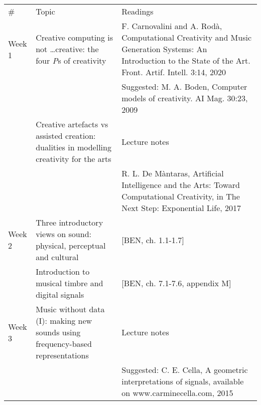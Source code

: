 \documentclass[letterpaper]{inzane_syllabus} %
\begin{document}
\begin{center}
\begin{tabularx}{\textwidth}{p{2cm}p{8cm} @{\hskip 0.5cm} p{9.5cm}} %
\arrayrulecolor{myCOLOR}\hline
\hline 
\hline 

\multicolumn{3}{l}{\textbf{\textcolor{myCOLOR}{\large MODULE 1: Foundations }}} \\
\hline
  \# & Topic & Readings \\ \hline 
Week 1 &
Creative computing is not \ldots creative: the four \emph{P}s of creativity & F. Carnovalini and A. Rod\`a, Computational Creativity and Music Generation Systems: An Introduction to the State of the Art. Front. Artif. Intell. 3:14, 2020  \\

& & Suggested: M. A. Boden, Computer models of creativity. AI Mag. 30:23, 2009 \\

& Creative artefacts vs assisted creation: dualities in modelling creativity for the arts&  Lecture notes \\
& & R. L. De M\`antaras, Artificial Intelligence and the Arts: Toward Computational Creativity, in The Next Step: Exponential Life, 2017\\
\arrayrulecolor{maingray}\hline

Week 2 & Three introductory views on sound: physical, perceptual and cultural & [BEN, ch. 1.1-1.7]\\

& Introduction to musical timbre and digital signals & [BEN, ch. 7.1-7.6, appendix M]\\
\arrayrulecolor{maingray}\hline
\arrayrulecolor{maingray}\hline
\arrayrulecolor{maingray}\hline
\arrayrulecolor{maingray}\hline

Week 3 & Music without data (I): making new sounds using frequency-based representations & Lecture notes\\

& & Suggested: C. E. Cella, A geometric interpretations of signals, available on www.carminecella.com, 2015\\


\end{tabularx}
\end{center}
\end{document}
